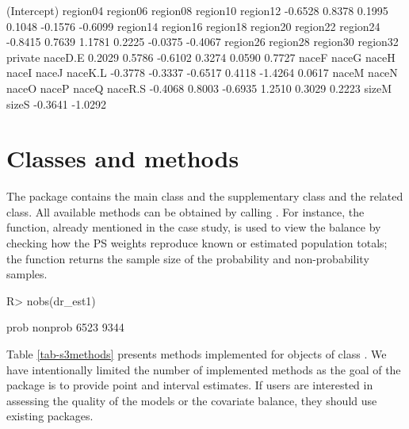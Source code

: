 \documentclass[nojss]{jss}
\begin{document}
\begin{CodeChunk}
\begin{CodeOutput}
(Intercept)    region04    region06    region08    region10    region12 
    -0.6528      0.8378      0.1995      0.1048     -0.1576     -0.6099 
   region14    region16    region18    region20    region22    region24 
    -0.8415      0.7639      1.1781      0.2225     -0.0375     -0.4067 
   region26    region28    region30    region32     private     naceD.E 
     0.2029      0.5786     -0.6102      0.3274      0.0590      0.7727 
      naceF       naceG       naceH       naceI       naceJ     naceK.L 
    -0.3778     -0.3337     -0.6517      0.4118     -1.4264      0.0617 
      naceM       naceN       naceO       naceP       naceQ     naceR.S 
    -0.4068      0.8003     -0.6935      1.2510      0.3029      0.2223 
      sizeM       sizeS 
    -0.3641     -1.0292 
\end{CodeOutput}
\end{CodeChunk}

\section[Classes and S3 methods]{Classes and  methods}\label{sec-s3methods}

The package contains the main class  and the supplementary
class  and the related 
class. All available  methods can be obtained by calling
. For instance, the
 function, already mentioned in the case study, is
used to view the balance by checking how the PS weights reproduce known
or estimated population totals; the  function returns the
sample size of the probability and non-probability samples.

\begin{CodeChunk}
\begin{CodeInput}
R> nobs(dr_est1)
\end{CodeInput}
\begin{CodeOutput}
   prob nonprob 
   6523    9344 
\end{CodeOutput}
\end{CodeChunk}

Table \ref{tab-s3methods} presents  methods implemented for
objects of class . We have intentionally limited the
number of implemented methods as the goal of the package is to provide
point and interval estimates. If users are interested in assessing the
quality of the models or the covariate balance, they should use existing
 packages.
\end{document}
